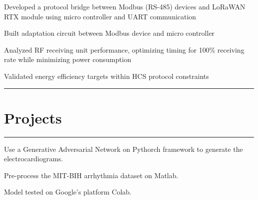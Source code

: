 \documentclass[]{dske-resume-openfont}
\newcommand{\sectionwithlines}[1]{%
    \vspace{0.5cm}%
    {\noindent\rule{\linewidth}{0.4pt}}%
    \section{#1}%
    {\noindent\rule{\linewidth}{0.4pt}}%
    \vspace{0.3cm}%
}
\begin{document}
\begin{minipage}[t]{0.66\textwidth}
\sectionsep
{}
\vspace{\topsep}
\begin{tightemize}
\item Developed a protocol bridge between Modbus (RS-485) devices and LoRaWAN RTX module using micro controller and UART communication
\item Built adaptation circuit between Modbus device and micro controller
\item Analyzed RF receiving unit performance, optimizing timing for 100\% receiving rate while minimizing power consumption
\item Validated energy efficiency targets within HCS protocol constraints
\end{tightemize}




\sectionsep



\sectionwithlines{Projects}
\vspace{\topsep} %
\begin{tightemize}
\item Use a Generative Adversarial Network on Pythorch framework to generate the electrocardiograms.
\item Pre-process the MIT-BIH arrhythmia dataset on Matlab.
\item Model tested on Google's platform Colab.
\end{tightemize}
\sectionsep



\end{minipage}
\end{document}
